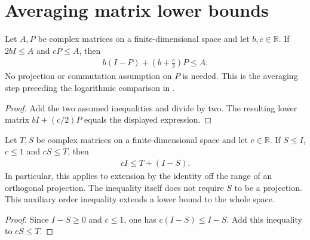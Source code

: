 \section{Averaging matrix lower bounds}
\label{sec:matrix_floor_pin}

\begin{theorem}
\label{thm:matrix_floor_pin}
\leanok
Let $A,P$ be complex matrices on a finite-dimensional space and let
$b,c\in\mathbb R$. If $2bI\le A$ and $cP\le A$, then
\begin{align}
 b(I-P)+\left(b+\frac c2\right)P\le A.
\end{align}
No projection or commutation assumption on $P$ is needed. This is the
averaging step preceding the logarithmic comparison in
\cite[Section~7, lines~603--615]{OpenAI2026AreaLaw}.
\end{theorem}
\begin{proof}
\leanok
Add the two assumed inequalities and divide by two. The resulting lower
matrix $bI+(c/2)P$ equals the displayed expression.
\end{proof}

\begin{theorem}
\label{thm:matrix_identity_extension_floor}
\leanok
Let $T,S$ be complex matrices on a finite-dimensional space and let
$c\in\mathbb R$. If $S\le I$, $c\le1$ and $cS\le T$, then
\begin{align}
 cI\le T+(I-S).
\end{align}
In particular, this applies to extension by the identity off the range
of an orthogonal projection. The inequality itself does not require
$S$ to be a projection. This auxiliary order inequality extends a lower
bound to the whole space.
\end{theorem}
\begin{proof}
\leanok
Since $I-S\ge0$ and $c\le1$, one has $c(I-S)\le I-S$.
Add this inequality to $cS\le T$.
\end{proof}
